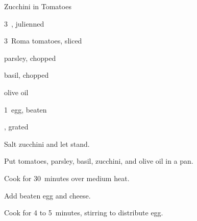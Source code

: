 \begin{recipe}{Zucchini in Tomatoes}{}{}

\begin{ingredients}
\item 3~, julienned
\item 3~Roma tomatoes, sliced
\item parsley, chopped
\item basil, chopped
\item olive oil
\item 1~egg, beaten
\item {}, grated
\end{ingredients}

\begin{directions}
\item Salt zucchini and let stand.
\item Put tomatoes, parsley, basil, zucchini, and olive oil in a pan.
\item Cook for 30~minutes over medium heat.
\item Add beaten egg and cheese.
\item Cook for 4 to 5~minutes, stirring to distribute egg.
\end{directions}

\end{recipe}
